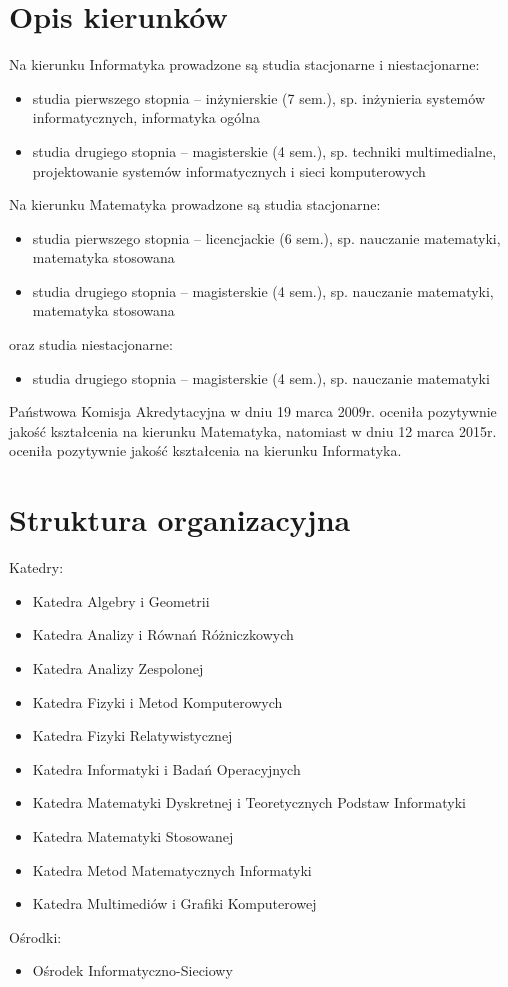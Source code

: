 \documentclass[a4paper,12pt]{article}
\begin{document}
\section{Opis kierunków}
Na kierunku Informatyka prowadzone są studia stacjonarne i niestacjonarne:
\begin{itemize}
\item{studia pierwszego stopnia – inżynierskie (7 sem.), sp. inżynieria systemów informatycznych, informatyka ogólna}
\item{studia drugiego stopnia – magisterskie (4 sem.), sp. techniki multimedialne, projektowanie systemów informatycznych i sieci komputerowych}
\end{itemize}
Na kierunku Matematyka prowadzone są studia stacjonarne:
\begin{itemize}
\item{studia pierwszego stopnia – licencjackie (6 sem.), sp. nauczanie matematyki, matematyka stosowana}
\item{studia drugiego stopnia – magisterskie (4 sem.), sp. nauczanie matematyki, matematyka stosowana}
\end{itemize}
oraz studia niestacjonarne:
\begin{itemize}
\item{studia drugiego stopnia – magisterskie (4 sem.), sp. nauczanie matematyki}
\end{itemize}
Państwowa Komisja Akredytacyjna w dniu 19 marca 2009r. oceniła pozytywnie jakość kształcenia na kierunku Matematyka, natomiast w dniu 12 marca 2015r. oceniła pozytywnie jakość kształcenia na kierunku Informatyka.

\section{Struktura organizacyjna}
Katedry:
\begin{itemize}
\item{Katedra Algebry i Geometrii}
\item{Katedra Analizy i Równań Różniczkowych}
\item{Katedra Analizy Zespolonej}
\item{Katedra Fizyki i Metod Komputerowych}
\item{Katedra Fizyki Relatywistycznej}
\item{Katedra Informatyki i Badań Operacyjnych}
\item{Katedra Matematyki Dyskretnej i Teoretycznych Podstaw Informatyki}
\item{Katedra Matematyki Stosowanej}
\item{Katedra Metod Matematycznych Informatyki}
\item{Katedra Multimediów i Grafiki Komputerowej}
\end{itemize}
Ośrodki:
\begin{itemize}
\item{Ośrodek Informatyczno-Sieciowy}
\end{itemize}
\end{document}
